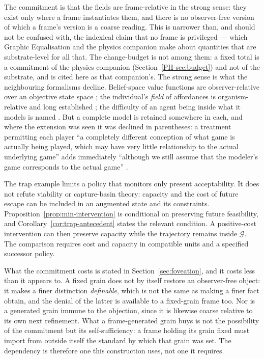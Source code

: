 \documentclass[11pt,a4paper]{article}
\theoremstyle{remark}
\newcommand{\Goal}{\mathcal G}
\begin{document}
The commitment is that the fields are frame-relative in the strong sense: they exist only where a
frame instantiates them, and there is no observer-free version of which a frame's version is a coarse
reading. This is narrower than, and should not be confused with, the indexical claim that no frame is
privileged --- which Graphic Equalisation and the physics companion make about quantities that are
substrate-level for all that. The change-budget is not among them: a fixed total is a commitment of
the physics companion (Section~\ref{PH-sec:budget}) and not of the substrate, and is cited here as
that companion's. The strong sense is what the neighbouring formalisms decline.
Belief-space value functions are observer-relative over an objective state space
\citep{kaelbling1998}; the individual's \emph{field} of affordances is organism-relative and long
established \citep{warren1984,rietveld2014}; the difficulty of an agent being inside what it models is
named \citep{demski2019}. But a complete model is retained somewhere in each, and where the extension
was seen it was declined in parentheses: a treatment permitting each player ``a completely different
conception of what game is actually being played, which may have very little relationship to the
actual underlying game'' adds immediately ``although we still assume that the modeler's game
corresponds to the actual game'' \citep{halpern2014}.

The trap example limits a policy that monitors only present acceptability.
It does not refute viability or capture-basin theory: capacity and the cost of
future escape can be included in an augmented state and its constraints.
Proposition~\ref{prop:min-intervention} is conditional on preserving future
feasibility, and Corollary~\ref{cor:trap-antecedent} states the relevant condition.
A positive-cost intervention can then preserve capacity while the trajectory
remains inside $\Goal$. The comparison requires cost and capacity in compatible
units and a specified successor policy.



What the commitment costs is stated in Section~\ref{sec:foveation}, and it costs less than it
appears to. A fixed grain does not by itself restore an observer-free object: it
makes a finer distinction \emph{definable}, which is not the same as making a finer fact obtain, and
the denial of the latter is available to a fixed-grain frame too. Nor is a generated grain immune to
the objection, since it is likewise coarse relative to its own next refinement. What a
frame-generated grain buys is not the possibility of the commitment but its self-sufficiency: a frame
holding its grain fixed must import from outside itself the standard by which that grain was set. The
dependency is therefore one this construction uses, not one it requires.
\end{document}
